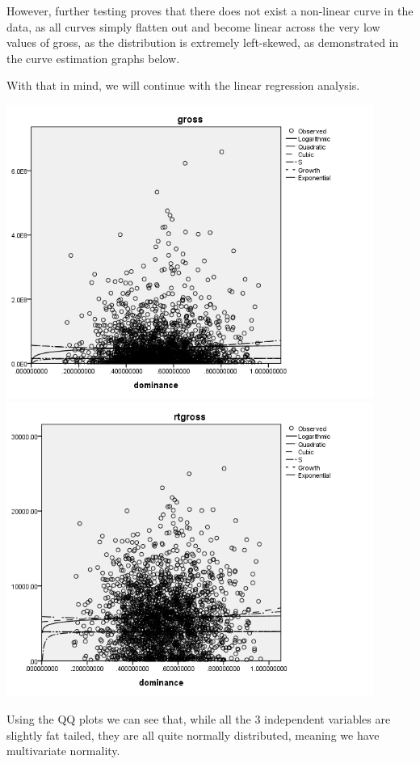 \documentclass[font=10pt]{article}
\begin{document}
However, further testing proves that there does not exist a non-linear curve in the data, as all curves simply flatten out and become linear across the very low values of gross, as the distribution is extremely left-skewed, as demonstrated in the curve estimation graphs below.

With that in mind, we will continue with the linear regression analysis.

\begin{center}
	\includegraphics[width=12cm]{curve_estimation}
	\includegraphics[width=12cm]{rtgross_curve_estimation}
\end{center}

Using the QQ plots we can see that, while all the 3 independent variables are slightly fat tailed, they are all quite normally distributed, meaning we have multivariate normality.
\end{document}

